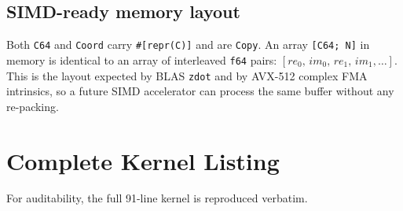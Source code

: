 \documentclass[11pt,a4paper]{article}
\theoremstyle{definition}
\newcommand{\CB}[1]{\texttt{#1}}
\begin{document}
\subsection{SIMD-ready memory layout}

Both \CB{C64} and \CB{Coord} carry \CB{\#[repr(C)]} and are \CB{Copy}.
An array \CB{[C64; N]} in memory is identical to an array of
interleaved \CB{f64} pairs:
$[\mathit{re}_0,\, \mathit{im}_0,\, \mathit{re}_1,\, \mathit{im}_1, \ldots]$.
This is the layout expected by BLAS \CB{zdot} and by AVX-512 complex
FMA intrinsics, so a future SIMD accelerator can process the same
buffer without any re-packing.

\section{Complete Kernel Listing}
\label{sec:listing}

For auditability, the full 91-line kernel is reproduced verbatim.
\end{document}
